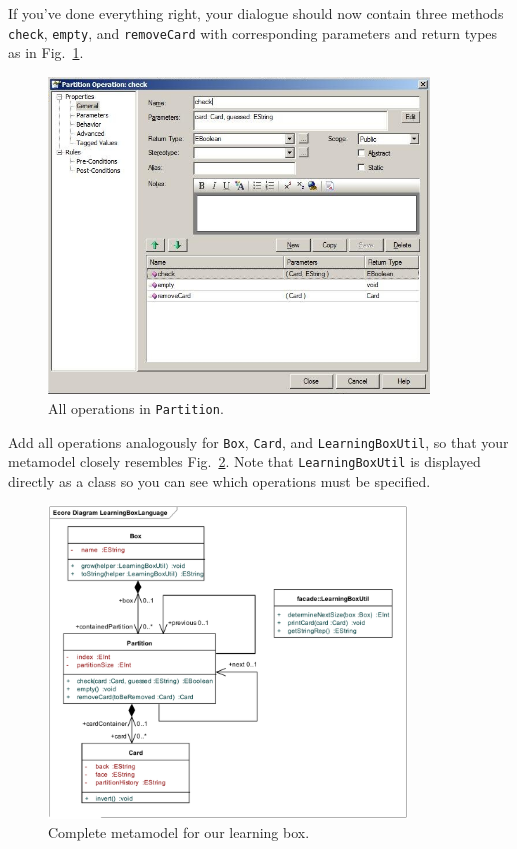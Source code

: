 If you've done everything right, your dialogue should now contain three methods \texttt{check}, \texttt{empty}, and \texttt{removeCard} with corresponding parameters and return types as in Fig.~\ref{fig:operation_partition}.
\begin{figure}[htbp]
	\centering
  \includegraphics[width=0.9\textwidth]{pics/memBoxBilder/memBox39}
	\caption{All operations in \texttt{Partition}.}
	\label{fig:operation_partition}
\end{figure}

Add all operations analogously for \texttt{Box}, \texttt{Card}, and \texttt{LearningBoxUtil}, so that your metamodel closely resembles Fig.~\ref{fig:metamodel_complete}. 
Note that \texttt{LearningBoxUtil} is displayed directly as a class so you can see which operations must be specified.
 
\begin{figure}[htbp]
	\centering  
  \includegraphics[width=0.85\textwidth]{pics/memBoxBilder/memBox44} 
	\caption{Complete metamodel for our learning box.}
	\label{fig:metamodel_complete}
\end{figure}

